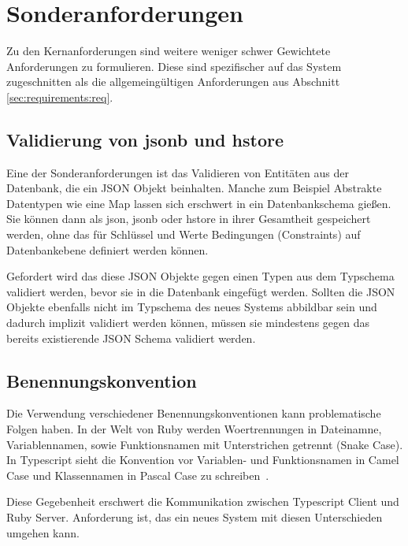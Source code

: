 \section{Sonderanforderungen}
Zu den Kernanforderungen sind weitere weniger schwer Gewichtete Anforderungen zu formulieren.
Diese sind spezifischer auf das System zugeschnitten als die allgemeingültigen Anforderungen aus Abschnitt \ref{sec:requirements:req}.

\subsection{Validierung von jsonb und hstore}
\label{req:validation:json}
Eine der Sonderanforderungen ist das Validieren von Entitäten aus der Datenbank, die ein JSON Objekt beinhalten.
Manche zum Beispiel Abstrakte Datentypen wie eine Map lassen sich erschwert in ein Datenbankschema gießen. Sie können dann als json,
jsonb oder hstore in ihrer Gesamtheit gespeichert werden, ohne das für Schlüssel und Werte Bedingungen (Constraints) auf Datenbankebene definiert werden können.

Gefordert wird das diese JSON Objekte gegen einen Typen aus dem Typschema validiert werden, bevor sie in die Datenbank eingefügt werden. Sollten die JSON Objekte ebenfalls nicht im Typschema des neues Systems abbildbar sein und dadurch implizit validiert werden können, müssen sie mindestens gegen das bereits existierende JSON Schema validiert werden.

\subsection{Benennungskonvention}
Die Verwendung verschiedener Benennungskonventionen kann problematische Folgen haben.
In der Welt von Ruby werden Woertrennungen in Dateinamne, Variablennamen, sowie Funktionsnamen mit Unterstrichen getrennt (Snake Case).
In Typescript sieht die Konvention vor Variablen- und Funktionsnamen in Camel Case und Klassennamen in Pascal Case zu schreiben~\cite{typescript-conventions}.

Diese Gegebenheit erschwert die Kommunikation zwischen Typescript Client und Ruby Server. Anforderung ist, das ein neues System mit diesen Unterschieden umgehen kann.
